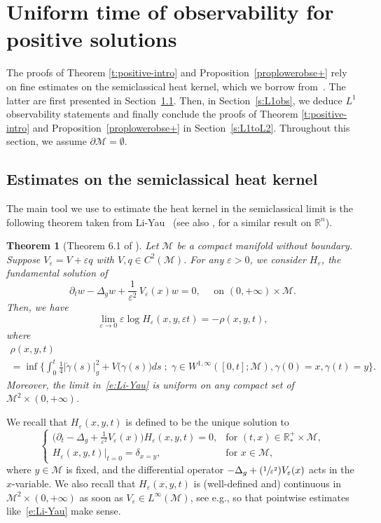 \documentclass[10pt]{amsart}
\newcommand{\Psfrac}[2]{(\sfrac{#1}{#2})}
\newcommand{\sep}{\;;\;}
\newtheorem{theorem}[lemma]{Theorem}
\theoremstyle{definition}
\newcommand{\M}{\ensuremath{\mathcal M}}
\newcommand{\mb}[1]{\ensuremath{\mathbb{#1}}}
\newcommand{\R}{{\mb{R}}}
\let\d\partial
\let\e\varepsilon
\let\eps\varepsilon
\providecommand{\eg}{e.g.}\providecommand{\ie}{i.e.}\providecommand{\etc}{etc.}
\begin{document}
\section{Uniform time of observability for positive solutions}
\label{s:positive}

The proofs of Theorem \ref{t:positive-intro} and Proposition~\ref{proplowerobse+} rely on fine estimates on the semiclassical heat kernel, which we borrow from~\cite{LY86}. The latter are first presented in Section~\ref{s:Li-Yau}. Then, in Section~\ref{s:L1obs}, we deduce $L^1$ observability statements and finally conclude the proofs of Theorem \ref{t:positive-intro} and Proposition~\ref{proplowerobse+} in Section~\ref{s:L1toL2}.
Throughout this section, we assume $\d\M=\emptyset$.

\subsection{Estimates on the semiclassical heat kernel}
\label{s:Li-Yau}
The main tool we use to estimate the heat kernel in the semiclassical limit is the following theorem taken from Li-Yau~\cite{LY86} (see also \cite{Simon:83}, for a similar result on $\R^{n}$).
\begin{theorem}[Theorem 6.1 of \cite{LY86}]
\label{t:thm-LiYau}
Let $\M$ be a compact manifold without boundary. Suppose $V_\eps = V + \eps q$ with $V,q \in C^2(\M)$. For any $\e>0$, we consider $H_{\e}$, the fundamental solution of
\[
\partial_t w-\Delta_g w+\frac{1}{\e^2}\,V_\eps (x)w=0, \quad \text{ on }(0,+\infty)\times \M.
\]
Then, we have
\begin{equation}
\label{e:Li-Yau}
\underset{\e\to 0}{\lim}\e \log H_{\e}(x,y,\e t)=-\rho(x,y,t),
\end{equation}
where
\begin{multline}
\label{e:def-rho-V}
\rho(x,y,t)\\
= \inf \biggl\{ \int_0^t \frac{1}{4}|\dot{\gamma}(s)|_g^2 +V \big( \gamma(s) \big)ds\sep \gamma \in W^{1,\infty} ([0,t] ; \M ), \gamma(0)=x, \gamma(t)= y \biggr\}.
\end{multline}
Moreover, the limit in~\eqref{e:Li-Yau} is uniform on any compact set of $\M^2\times (0,+\infty)$.
\end{theorem}
We recall that $H_\eps(x,y,t)$ is defined to be the unique solution to
\begin{equation}
\label{e:heat-kernel-def}
\begin{cases}
\Big(\d_t -\Delta_g+\frac{1}{\e^2} V_\eps(x) \Big) H_{\e}(x,y,t)= 0, & \text{for } (t,x) \in \R^+_*\times \M, \\
H_{\e}(x,y,t) |_{t=0} = \delta_{x=y}, & \text{for } x \in \M,
\end{cases}
\end{equation}
where $y \in \M$ is fixed, and the differential operator $ -\Delta_g+\Psfrac{1}{\e^2} V_\eps(x)$ acts in the $x$\nobreakdash-variable.
We also recall that $H_{\e}(x,y,t)$ is (well-defined and) continuous in \hbox{$\M^2\times (0,+\infty)$} as soon as $V_\eps\in L^\infty(\M)$, see \eg \cite[Th.\,B.7.1\,(a$'''$)]{Simon:82}, so that pointwise estimates like~\eqref{e:Li-Yau} make sense.
\end{document}
